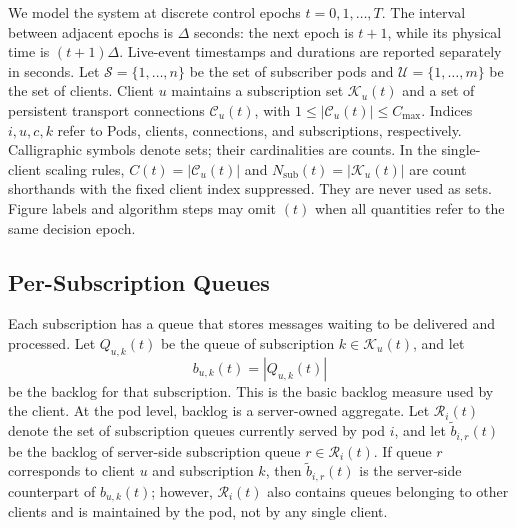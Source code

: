 \documentclass[manuscript,nonacm]{acmart}
\begin{document}
We model the system at discrete control epochs $t=0,1,\ldots,T$. The interval
between adjacent epochs is $\Delta$ seconds: the next epoch is $t+1$, while
its physical time is $(t+1)\Delta$. Live-event timestamps and durations are
reported separately in seconds. Let
$\mathcal{S}=\{1,\ldots,n\}$ be the set of subscriber pods and
$\mathcal{U}=\{1,\ldots,m\}$ be the set of clients. Client $u$ maintains a
subscription set $\mathcal{K}_u(t)$ and a set of persistent transport
connections $\mathcal{C}_u(t)$, with
$1\leq |\mathcal{C}_u(t)|\leq C_{\max}$.
Indices $i,u,c,k$ refer to Pods, clients, connections, and subscriptions,
respectively. Calligraphic symbols denote sets; their cardinalities are
counts. In the single-client scaling rules, $C(t)=|\mathcal{C}_u(t)|$ and
$N_{\mathrm{sub}}(t)=|\mathcal{K}_u(t)|$ are count shorthands with the fixed client
index suppressed. They are never used as sets. Figure labels and algorithm
steps may omit $(t)$ when all quantities refer to the same decision epoch.

\subsection{Per-Subscription Queues}

Each subscription has a queue that stores messages waiting to be delivered and
processed. Let $Q_{u,k}(t)$ be the queue of subscription
$k\in\mathcal{K}_u(t)$, and let
\begin{equation}
	b_{u,k}(t)=|Q_{u,k}(t)|
\end{equation}
be the backlog for that subscription. This is the basic backlog measure used
by the client. At the pod level, backlog is a
server-owned aggregate. Let $\mathcal{R}_i(t)$ denote the set of subscription
queues currently served by pod $i$, and let $\tilde{b}_{i,r}(t)$ be the backlog
of server-side subscription queue $r\in\mathcal{R}_i(t)$. If queue $r$
corresponds to client $u$ and subscription $k$, then $\tilde{b}_{i,r}(t)$ is
the server-side counterpart of $b_{u,k}(t)$; however, $\mathcal{R}_i(t)$ also
contains queues belonging to other clients and is maintained by the pod, not by
any single client.
\end{document}
